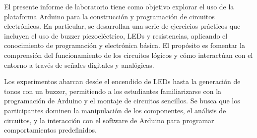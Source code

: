 El presente informe de laboratorio tiene como objetivo explorar el uso de la plataforma Arduino para la construcción y programación de circuitos electrónicos. En particular, se desarrollan una serie de ejercicios prácticos que incluyen el uso de buzzer piezoeléctrico, LEDs y resistencias, aplicando el conocimiento de programación y electrónica básica. El propósito es fomentar la comprensión del funcionamiento de los circuitos lógicos y cómo interactúan con el entorno a través de señales digitales y analógicas.

Los experimentos abarcan desde el encendido de LEDs hasta la generación de tonos con un buzzer, permitiendo a los estudiantes familiarizarse con la programación de Arduino y el montaje de circuitos sencillos. Se busca que los participantes dominen la manipulación de los componentes, el análisis de circuitos, y la interacción con el software de Arduino para programar comportamientos predefinidos.